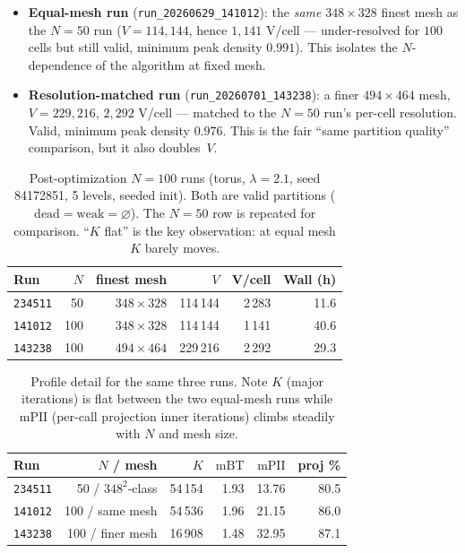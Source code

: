 \documentclass[11pt,a4paper]{article}
\begin{document}
\begin{itemize}
  \item \textbf{Equal-mesh run} (\texttt{run\_20260629\_141012}): the
    \emph{same} $348\times328$ finest mesh as the $N=50$ run
    ($V=114{,}144$, hence $1{,}141$ V/cell --- under-resolved for $100$
    cells but still valid, minimum peak density $0.991$).  This isolates the
    $N$-dependence of the algorithm at fixed mesh.
  \item \textbf{Resolution-matched run} (\texttt{run\_20260701\_143238}): a
    finer $494\times464$ mesh, $V=229{,}216$, $2{,}292$ V/cell --- matched to
    the $N=50$ run's per-cell resolution.  Valid, minimum peak density
    $0.976$.  This is the fair ``same partition quality'' comparison, but it
    also doubles~$V$.
\end{itemize}

\begin{table}[H]
\centering
\caption{Post-optimization $N=100$ runs (torus, $\lambda=2.1$, seed 84172851,
5 levels, seeded init).  Both are valid partitions
($\mathrm{dead}=\mathrm{weak}=\varnothing$).  The $N=50$ row is repeated for
comparison.  ``$K$ flat'' is the key observation: at equal mesh $K$ barely
moves.}
\label{tab:n100}
\renewcommand{\arraystretch}{1.25}
\begin{tabular}{lrrrrr}
\toprule
Run & $N$ & finest mesh & $V$ & V/cell & Wall (h) \\
\midrule
\texttt{234511} & \phantom{0}50 & $348\times328$ & 114\,144 & 2\,283 & 11.6 \\
\texttt{141012} & 100 & $348\times328$ & 114\,144 & 1\,141 & 40.6 \\
\texttt{143238} & 100 & $494\times464$ & 229\,216 & 2\,292 & 29.3 \\
\bottomrule
\end{tabular}
\end{table}

\begin{table}[H]
\centering
\caption{Profile detail for the same three runs.  Note $K$ (major iterations)
is flat between the two equal-mesh runs while $\mathrm{mPII}$ (per-call
projection inner iterations) climbs steadily with $N$ and mesh size.}
\label{tab:n100-profile}
\renewcommand{\arraystretch}{1.25}
\begin{tabular}{lrrrrr}
\toprule
Run & $N$ / mesh & $K$ & $\mathrm{mBT}$ & $\mathrm{mPII}$ & proj \% \\
\midrule
\texttt{234511} & 50 / $348^2$-class  & 54\,154 & 1.93 & 13.76 & 80.5 \\
\texttt{141012} & 100 / same mesh     & 54\,536 & 1.96 & 21.15 & 86.0 \\
\texttt{143238} & 100 / finer mesh    & 16\,908 & 1.48 & 32.95 & 87.1 \\
\bottomrule
\end{tabular}
\end{table}
\end{document}
